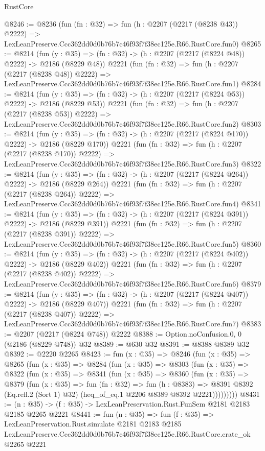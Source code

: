 \begin{lexlean}{RustCore}
\begin{coremodule}
@8246 := @8236
    (fun (fn : @32) =>
    fun (h : @2207 (@2217 (@8238 @43)) @2222) =>
    LexLeanPreserve.Ccc362dd0d0b76b7c46f93f7f38ec125e.R66.RustCore.fun0)
@8265 := @8214
    (fun (y : @35) => (fn : @32) -> (h : @2207 (@2217 (@8224 @48)) @2222) -> @2186 (@8229 @48))
    @2221
    (fun (fn : @32) =>
    fun (h : @2207 (@2217 (@8238 @48)) @2222) =>
    LexLeanPreserve.Ccc362dd0d0b76b7c46f93f7f38ec125e.R66.RustCore.fun1)
@8284 := @8214
    (fun (y : @35) => (fn : @32) -> (h : @2207 (@2217 (@8224 @53)) @2222) -> @2186 (@8229 @53))
    @2221
    (fun (fn : @32) =>
    fun (h : @2207 (@2217 (@8238 @53)) @2222) =>
    LexLeanPreserve.Ccc362dd0d0b76b7c46f93f7f38ec125e.R66.RustCore.fun2)
@8303 := @8214
    (fun (y : @35) => (fn : @32) -> (h : @2207 (@2217 (@8224 @170)) @2222) -> @2186 (@8229 @170))
    @2221
    (fun (fn : @32) =>
    fun (h : @2207 (@2217 (@8238 @170)) @2222) =>
    LexLeanPreserve.Ccc362dd0d0b76b7c46f93f7f38ec125e.R66.RustCore.fun3)
@8322 := @8214
    (fun (y : @35) => (fn : @32) -> (h : @2207 (@2217 (@8224 @264)) @2222) -> @2186 (@8229 @264))
    @2221
    (fun (fn : @32) =>
    fun (h : @2207 (@2217 (@8238 @264)) @2222) =>
    LexLeanPreserve.Ccc362dd0d0b76b7c46f93f7f38ec125e.R66.RustCore.fun4)
@8341 := @8214
    (fun (y : @35) => (fn : @32) -> (h : @2207 (@2217 (@8224 @391)) @2222) -> @2186 (@8229 @391))
    @2221
    (fun (fn : @32) =>
    fun (h : @2207 (@2217 (@8238 @391)) @2222) =>
    LexLeanPreserve.Ccc362dd0d0b76b7c46f93f7f38ec125e.R66.RustCore.fun5)
@8360 := @8214
    (fun (y : @35) => (fn : @32) -> (h : @2207 (@2217 (@8224 @402)) @2222) -> @2186 (@8229 @402))
    @2221
    (fun (fn : @32) =>
    fun (h : @2207 (@2217 (@8238 @402)) @2222) =>
    LexLeanPreserve.Ccc362dd0d0b76b7c46f93f7f38ec125e.R66.RustCore.fun6)
@8379 := @8214
    (fun (y : @35) => (fn : @32) -> (h : @2207 (@2217 (@8224 @407)) @2222) -> @2186 (@8229 @407))
    @2221
    (fun (fn : @32) =>
    fun (h : @2207 (@2217 (@8238 @407)) @2222) =>
    LexLeanPreserve.Ccc362dd0d0b76b7c46f93f7f38ec125e.R66.RustCore.fun7)
@8383 := @2207 (@2217 (@8224 @748)) @2222
@8388 := Option.noConfusion.{0, 0} (@2186 (@8229 @748)) @32
@8389 := @630 @32
@8391 := @8388 @8389 @32
@8392 := @2220 @2265
@8423 := fun (x : @35) =>
  @8246
    (fun (x : @35) =>
    @8265
      (fun (x : @35) =>
      @8284
        (fun (x : @35) =>
        @8303
          (fun (x : @35) =>
          @8322
            (fun (x : @35) =>
            @8341
              (fun (x : @35) =>
              @8360
                (fun (x : @35) =>
                @8379
                  (fun (x : @35) =>
                  fun (fn : @32) =>
                  fun (h : @8383) =>
                  @8391
                    @8392
                    (Eq.refl.{2} (Sort 1) @32)
                    (heq_of_eq.{1} @2206 @8389 @8392 @2221)))))))))
@8431 := (n : @35) -> (f : @35) -> LexLeanPreservation.Rust.FunSem @2181 @2183 @2185 @2265 @2221
@8441 := fun (n : @35) =>
  fun (f : @35) =>
  LexLeanPreservation.Rust.simulate
    @2181
    @2183
    @2185
    LexLeanPreserve.Ccc362dd0d0b76b7c46f93f7f38ec125e.R66.RustCore.crate_ok
    @2265
    @2221
\end{coremodule}
\end{lexlean}
